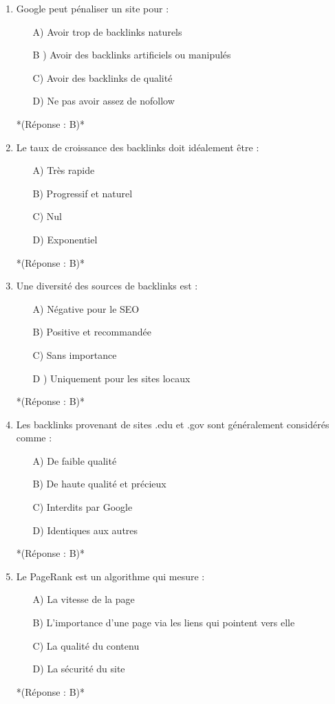 \documentclass[12pt,a4paper,twoside]{report}
\begin{document}
\begin{enumerate}
\item Google peut pénaliser un site pour :
\begin{itemize}
\item[A)] Avoir trop de backlinks naturels
\item[B]) Avoir des backlinks artificiels ou manipulés
\item[C)] Avoir des backlinks de qualité
\item[D)] Ne pas avoir assez de nofollow
\end{itemize}
*(Réponse : B)*

\item Le taux de croissance des backlinks doit idéalement être :
\begin{itemize}
\item[A)] Très rapide
\item[B)] Progressif et naturel
\item[C)] Nul
\item[D)] Exponentiel
\end{itemize}
*(Réponse : B)*

\item Une diversité des sources de backlinks est :
\begin{itemize}
\item[A)] Négative pour le SEO
\item[B)] Positive et recommandée
\item[C)] Sans importance
\item[D]) Uniquement pour les sites locaux
\end{itemize}
*(Réponse : B)*

\item Les backlinks provenant de sites .edu et .gov sont généralement considérés comme :
\begin{itemize}
\item[A)] De faible qualité
\item[B)] De haute qualité et précieux
\item[C)] Interdits par Google
\item[D)] Identiques aux autres
\end{itemize}
*(Réponse : B)*

\item Le PageRank est un algorithme qui mesure :
\begin{itemize}
\item[A)] La vitesse de la page
\item[B)] L'importance d'une page via les liens qui pointent vers elle
\item[C)] La qualité du contenu
\item[D)] La sécurité du site
\end{itemize}
*(Réponse : B)*


\end{enumerate}
\end{document}
